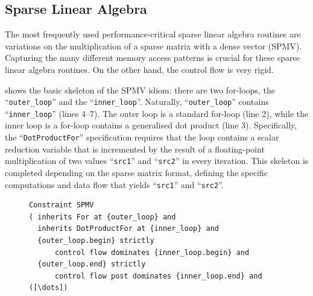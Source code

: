 \subsection{Sparse Linear Algebra}

    The most frequently used performance-critical sparse linear algebra routines
    are variations on the multiplication of a sparse matrix with a dense vector
    (SPMV).
    Capturing the many different memory access patterns is crucial for these
    sparse linear algebra routines.
    On the other hand, the control flow is very rigid.

     shows the basic skeleton of the SPMV idiom:
    there are two for-loops, the ``{\tt outer\_loop}'' and the
    ``{\tt inner\_loop}''.
    Naturally, ``{\tt outer\_loop}'' contains ``{\tt inner\_loop}''
    (lines 4--7).
    The outer loop is a standard for-loop (line 2), while the inner loop is a
    for-loop contains a generalised dot product (line 3).
    Specifically, the ``{\tt DotProductFor}'' specification requires that the
    loop contains a scalar reduction variable that is incremented by the result
    of a floating-point multiplication of two values ``{\tt src1}'' and
    ``{\tt src2}'' in every iteration.
    This skeleton is completed depending on the sparse matrix format, defining
    the specific computations and data flow that yields ``{\tt src1}'' and
    ``{\tt src2}''.

\begin{figure}[p]
\begin{lstlisting}[language=IDL, label={spmvbase}, caption=
   {Skeleton of the sparse matrix-vector product (SPMV) constraint
    specification in IDL: The precise sparse access patterns are specific to
    chosen storage formats for sparse matrices.}]
Constraint SPMV
( inherits For at {outer_loop} and
  inherits DotProductFor at {inner_loop} and
  {outer_loop.begin} strictly
      control flow dominates {inner_loop.begin} and
  {outer_loop.end} strictly
      control flow post dominates {inner_loop.end} and
([\dots])
\end{lstlisting}
\end{figure}


